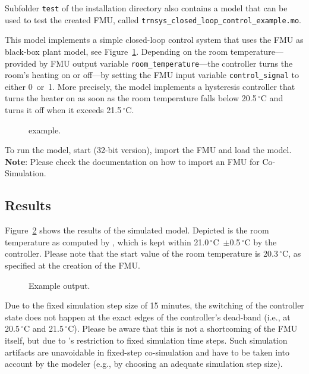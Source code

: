 Subfolder \verb!test! of the installation directory also contains a \dymola model that can be used to test the created \trnsys FMU, called \verb!trnsys_closed_loop_control_example.mo!.


This model implements a simple closed-loop control system that uses the FMU as black-box plant model, see Figure~\ref{fig:dymola_example}.
Depending on the room temperature---provided by FMU output variable \verb!room_temperature!---the controller turns the room's heating on or off---by setting the FMU input variable \verb!control_signal! to either 0~or~1.
More precisely, the model implements a hysteresis controller that turns the heater on as soon as the room temperature falls below 20.5$\,^\circ$C and turns it off when it exceeds 21.5$\,^\circ$C.

\begin{figure}[h!]
\caption{\dymola example.}
\label{fig:dymola_example}
\end{figure}

To run the model, start \dymola (32-bit version), import the FMU and load the \dymola model. \textbf{Note}: Please check the \dymola documentation on how to import an FMU for Co-Simulation.


\subsection{Results}
\label{sec:example:results}

Figure~\ref{fig:dymola_output} shows the results of the simulated \dymola model.
Depicted is the room temperature as computed by \trnsys, which is kept within 21.0$\,^\circ$C~$\pm$0.5$\,^\circ$C by the \dymola controller.
Please note that the start value of the room temperature is 20.3$\,^\circ$C, as specified at the creation of the FMU.

\begin{figure}[h!]
\caption{Example \dymola output.}
\label{fig:dymola_output}
\end{figure}

Due to the fixed simulation step size of 15 minutes, the switching of the controller state does not happen at the exact edges of the controller's dead-band (i.e., at 20.5$\,^\circ$C and 21.5$\,^\circ$C).
Please be aware that this is not a shortcoming of the FMU itself, but due to \trnsys's restriction to fixed simulation time steps.
Such simulation artifacts are unavoidable in fixed-step co-simulation and have to be taken into account by the modeler (e.g., by choosing an adequate simulation step size).
